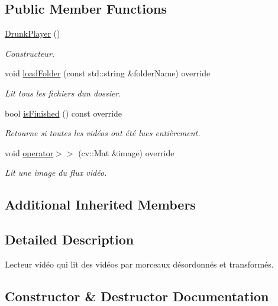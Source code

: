 \subsection*{Public Member Functions}
\begin{DoxyCompactItemize}
\item 
\hyperlink{classDrunkPlayer_a39c64a774a19456f3a4c194ec5e1131f}{Drunk\+Player} ()
\begin{DoxyCompactList}\small\item\em Constructeur. \end{DoxyCompactList}\item 
void \hyperlink{classDrunkPlayer_a235e60ea8a97c4d26277b066c2cebe80}{load\+Folder} (const std\+::string \&folder\+Name) override
\begin{DoxyCompactList}\small\item\em Lit tous les fichiers d\textquotesingle{}un dossier. \end{DoxyCompactList}\item 
bool \hyperlink{classDrunkPlayer_a9c032dda7df01fafc757fb1f4e265bb4}{is\+Finished} () const override
\begin{DoxyCompactList}\small\item\em Retourne si toutes les vidéos ont été lues entièrement. \end{DoxyCompactList}\item 
void \hyperlink{classDrunkPlayer_a2662f5010e15c95ca6639f56f012aed1}{operator$>$$>$} (cv\+::\+Mat \&image) override
\begin{DoxyCompactList}\small\item\em Lit une image du flux vidéo. \end{DoxyCompactList}\end{DoxyCompactItemize}
\subsection*{Additional Inherited Members}


\subsection{Detailed Description}
Lecteur vidéo qui lit des vidéos par morceaux désordonnés et transformés. 

\subsection{Constructor \& Destructor Documentation}

